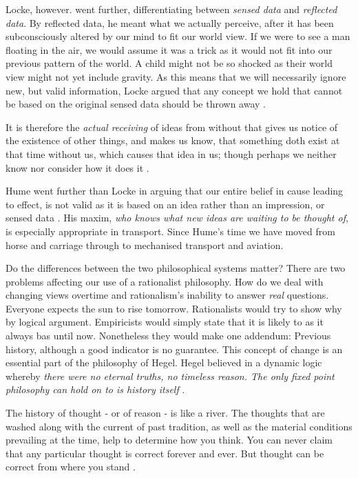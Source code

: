 Locke, however. went further, differentiating between \textit{sensed data} and \textit{reflected data}. By reflected data, he meant what we actually perceive, after it has been subconsciously altered by our mind to fit our world view. If we were to see a man floating in the air, we would assume it was a trick as it would not fit into our previous pattern of the world. A child might not be so shocked as their world view might not yet include gravity. As this means that we will necessarily ignore new, but valid information, Locke argued that any concept we hold that cannot be based on the original sensed data should be thrown away \cite{Pojman:1991}.

\begin{displayquote}
It is therefore the \textit{actual receiving} of ideas from without that gives us notice of the existence of other things, and makes us know, that something doth exist at that time without us, which causes that idea in us; though perhaps we neither know nor consider how it does it \cite{Locke:1689}.
\end{displayquote}

Hume went further than Locke in arguing that our entire belief in cause leading to effect, is not valid as it is based on an idea rather than an impression, or sensed data \cite{Hume:1748}. His maxim, \textit{who knows what new ideas are waiting to be thought of}, is especially appropriate in transport. Since Hume's time we have moved from horse and carriage through to mechanised transport and aviation.

Do the differences between the two philosophical systems matter? There are two problems affecting our use of a rationalist philosophy. How do we deal with changing views overtime and rationalism's inability to answer \textit{real} questions. Everyone expects the sun to rise tomorrow. Rationalists would try to show why by logical argument. Empiricists would simply state that it is likely to as it always bas until now. Nonetheless they would make one addendum: Previous history, although a good indicator is no guarantee. This concept of change is an essential part of the philosophy of Hegel. Hegel believed in a dynamic logic whereby \textit{there were no eternal truths, no timeless reason. The only fixed point philosophy can hold on to is history itself} \cite{Hegel:1817}.

\begin{displayquote}
The history of thought - or of reason - is like a river. The thoughts that are washed along with the current of past tradition, as well as the material conditions prevailing at the time, help to determine how you think. You can never claim that any particular thought is correct forever and ever. But thought can be correct from where you stand \cite{Gardner:1995}.
\end{displayquote}

